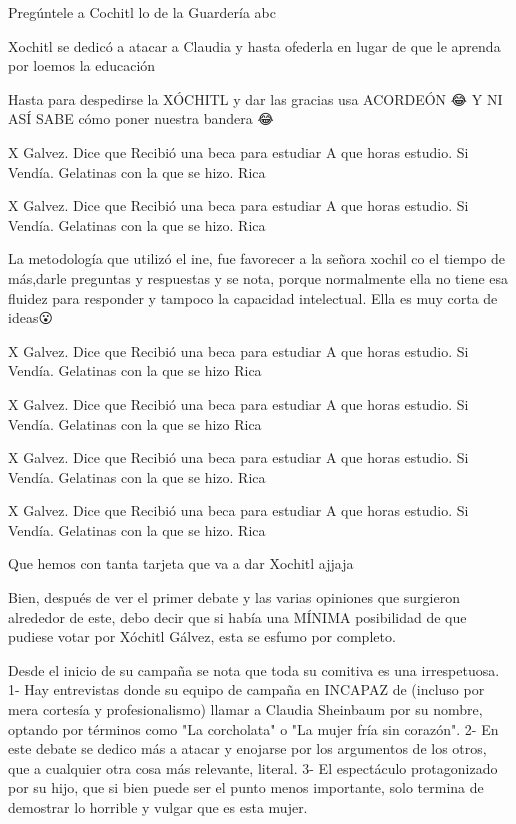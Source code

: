 Pregúntele a Cochitl lo de la Guardería abc

Xochitl se dedicó a atacar a Claudia y hasta ofederla  en lugar de que le aprenda por loemos la educación

Hasta para despedirse la XÓCHITL y dar las gracias usa ACORDEÓN 😂 Y NI ASÍ SABE cómo poner nuestra bandera 😂

X  Galvez.  Dice que Recibió una beca para estudiar
A que horas estudio. Si
Vendía. Gelatinas  con la que se hizo.  Rica

X  Galvez.  Dice que Recibió una beca para estudiar
A que horas estudio. Si
Vendía. Gelatinas  con la que se hizo.  Rica

La metodología que utilizó el ine, fue favorecer a la señora xochil co el tiempo de más,darle preguntas y respuestas y se nota, porque normalmente ella no tiene esa fluidez para responder y tampoco la capacidad intelectual. Ella es muy corta de ideas😮

X  Galvez.  Dice que Recibió una beca para estudiar
A que horas estudio. Si
Vendía. Gelatinas  con la que se hizo  Rica

X  Galvez.  Dice que Recibió una beca para estudiar
A que horas estudio. Si
Vendía. Gelatinas  con la que se hizo  Rica

X  Galvez.  Dice que Recibió una beca para estudiar
A que horas estudio. Si
Vendía. Gelatinas  con la que se hizo.  Rica

X  Galvez.  Dice que Recibió una beca para estudiar
A que horas estudio. Si
Vendía. Gelatinas  con la que se hizo.  Rica

Que hemos con tanta tarjeta que va a dar Xochitl ajjaja

Bien, después de ver el primer debate y las varias opiniones que surgieron alrededor de este, debo decir que si había una MÍNIMA posibilidad de que pudiese votar por Xóchitl Gálvez, esta se esfumo por completo.

Desde el inicio de su campaña se nota que toda su comitiva es una irrespetuosa.
1- Hay entrevistas donde su equipo de campaña en INCAPAZ de (incluso por mera cortesía y profesionalismo) llamar a Claudia Sheinbaum por su nombre, optando por términos como "La corcholata" o "La mujer fría sin corazón".
2- En este debate se dedico más a atacar y enojarse por los argumentos de los otros, que a cualquier otra cosa más relevante, literal.
3- El espectáculo protagonizado por su hijo, que si bien puede ser el punto menos importante, solo termina de demostrar lo horrible y vulgar que es esta mujer.

